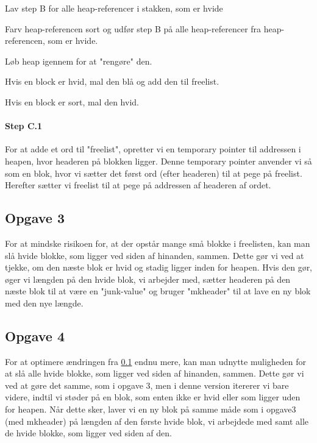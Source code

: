 \begin{my_description}
\item[Step A] Lav step B for alle heap-referencer i stakken, som er hvide
\item[Step B] Farv heap-referencen sort og udfør step B på alle heap-referencer fra heap-referencen, som er hvide.
\item[Step C] Løb heap igennem for at "rengøre" den.
	\begin{my_description}
	\item[Step C.1] Hvis en block er hvid, mal den blå og add den til freelist.
	\item[Step C.2] Hvis en block er sort, mal den hvid.
	\end{my_description}
\end{my_description}

\paragraph{Step C.1}
For at adde et ord til "freelist", opretter vi en temporary pointer til addressen i heapen, hvor headeren på blokken ligger. Denne temporary pointer anvender vi så som en blok, hvor vi sætter det først ord (efter headeren) til at pege på freelist. Herefter sætter vi freelist til at pege på addressen af headeren af ordet.

\subsection{Opgave 3}
\label{O2_3}
For at mindske risikoen for, at der opstår mange små blokke i freelisten, kan man slå hvide blokke, som ligger ved siden af hinanden, sammen. Dette gør vi ved at tjekke, om den næste blok er hvid og stadig ligger inden for heapen. Hvis den gør, øger vi længden på den hvide blok, vi arbejder med, sætter headeren på den næste blok til at være en "junk-value" og bruger "mkheader" til at lave en ny blok med den nye længde.
 
\subsection{Opgave 4}
\label{O2_4}
For at optimere ændringen fra \ref{O2_3} endnu mere, kan man udnytte muligheden for at slå alle hvide blokke, som ligger ved siden af hinanden, sammen. Dette gør vi ved at gøre det samme, som i opgave 3, men i denne version itererer vi bare videre, indtil vi støder på en blok, som enten ikke er hvid eller som ligger uden for heapen. Når dette sker, laver vi en ny blok på samme måde som i opgave3 (med mkheader) på længden af den første hvide blok, vi arbejdede med samt alle de hvide blokke, som ligger ved siden af den.

